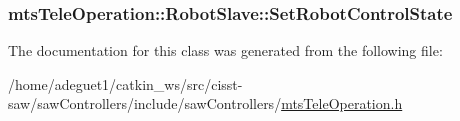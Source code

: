 \hypertarget{classmts_tele_operation_1_1_robot_slave_a7d66a6da265a36a7f88492030adb29af}{
\subsubsection[{Set\-Robot\-Control\-State}]{ mts\-Tele\-Operation\-::\-Robot\-Slave\-::\-Set\-Robot\-Control\-State}}\label{classmts_tele_operation_1_1_robot_slave_a7d66a6da265a36a7f88492030adb29af}


The documentation for this class was generated from the following file\-:\begin{DoxyCompactItemize}
\item 
/home/adeguet1/catkin\-\_\-ws/src/cisst-\/saw/saw\-Controllers/include/saw\-Controllers/\hyperlink{mts_tele_operation_8h}{mts\-Tele\-Operation.\-h}\end{DoxyCompactItemize}
